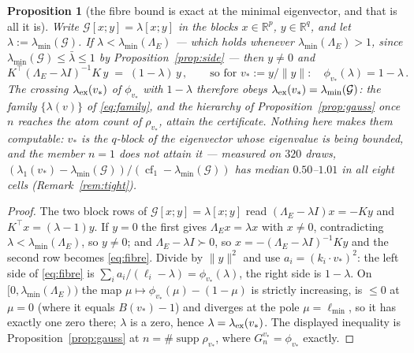 \documentclass[11pt]{article}
\newtheorem{proposition}[theorem]{Proposition}
\theoremstyle{remark}
\newcommand{\Gr}{\mathcal{G}}
\newcommand{\Le}{\Lambda_E}
\begin{document}
\begin{proposition}[the fibre bound is exact at the minimal eigenvector, and that is all it is]
\label{prop:tight}
Write $\Gr[x;y]=\lambda[x;y]$ in the blocks $x\in\mathbb R^{p}$, $y\in\mathbb R^{q}$, and let
$\lambda:=\lambda_{\min}(\Gr)$. If $\lambda<\lambda_{\min}(\Le)$ --- which holds whenever
$\lambda_{\min}(\Le)>1$, since $\lambda_{\min}(\Gr)\le\bar\lambda\le1$ by Proposition~\ref{prop:side}
--- then $y\ne0$ and
\begin{equation}\label{eq:fibre}
  K^{\top}(\Le-\lambda I)^{-1}K\,y\;=\;(1-\lambda)\,y\,,
  \qquad\text{so for }v_\ast:=y/\|y\|:\quad
  \phi_{v_\ast}(\lambda)=1-\lambda\,.
\end{equation}
The crossing $\lambda_{\rm ex}(v_\ast)$ of $\phi_{v_\ast}$ with $1-\lambda$ therefore obeys
$\lambda_{\rm ex}(v_\ast)=\lambda_{\min}(\Gr)$: the family $\{\lambda(v)\}$ of \eqref{eq:family}, and
the hierarchy of Proposition~\ref{prop:gauss} once $n$ reaches the atom count of $\rho_{v_\ast}$,
attain the certificate. Nothing here makes them \emph{computable}: $v_\ast$ is the $q$-block of the
eigenvector whose eigenvalue is being bounded, and the member $n=1$ does not attain it --- measured on
$320$ draws, $(\lambda_1(v_\ast)-\lambda_{\min}(\Gr))/(\operatorname{cf}_1-\lambda_{\min}(\Gr))$ has
median $0.50$--$1.01$ in all eight cells (Remark~\ref{rem:tight}).
\end{proposition}

\begin{proof}
The two block rows of $\Gr[x;y]=\lambda[x;y]$ read $(\Le-\lambda I)x=-Ky$ and $K^{\top}x=(\lambda-1)y$.
If $y=0$ the first gives $\Le x=\lambda x$ with $x\ne0$, contradicting $\lambda<\lambda_{\min}(\Le)$, so
$y\neq0$; and $\Le-\lambda I\succ0$, so $x=-(\Le-\lambda I)^{-1}Ky$ and the second row becomes
\eqref{eq:fibre}. Divide by $\|y\|^{2}$ and use $a_i=(k_i\cdot v_\ast)^{2}$: the left side of
\eqref{eq:fibre} is $\sum_ia_i/(\ell_i-\lambda)=\phi_{v_\ast}(\lambda)$, the right side is
$1-\lambda$. On $[0,\lambda_{\min}(\Le))$ the map $\mu\mapsto\phi_{v_\ast}(\mu)-(1-\mu)$ is strictly
increasing, is $\le0$ at $\mu=0$ (where it equals $B(v_\ast)-1$) and diverges at the pole
$\mu=\ell_{\min}$, so it has exactly one zero there; $\lambda$ is a zero, hence
$\lambda=\lambda_{\rm ex}(v_\ast)$. The displayed inequality is Proposition~\ref{prop:gauss} at
$n=\#\operatorname{supp}\rho_{v_\ast}$, where $G_n^{v_\ast}=\phi_{v_\ast}$ exactly.
\end{proof}
\end{document}
